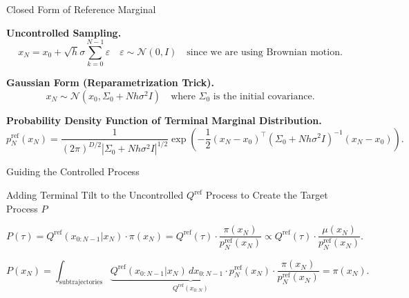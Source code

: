 \documentclass[aspectratio=169,xcolor=dvipsnames]{beamer}
\begin{document}
\begin{frame}{Closed Form of Reference Marginal}
\footnotesize

\textbf{Uncontrolled Sampling.}
\[
x_N = x_0 + \sqrt{h} \sigma \sum_{k=0}^{N-1} \varepsilon \quad \varepsilon \sim \mathcal{N}(0, I) \quad \text{since we are using Brownian motion}.
\]

\textbf{Gaussian Form (Reparametrization Trick).}
\[
x_N \sim \mathcal{N}(x_0, \Sigma_0 + N h \sigma^2 I) \quad \text{where } \Sigma_0 \text{ is the initial covariance.}
\]

\textbf{Probability Density Function of Terminal Marginal Distribution.}
\[
p^{\text{ref}}_N(x_N) = \frac{1}{(2\pi)^{D/2} |\Sigma_0 + N h \sigma^2 I|^{1/2}} \exp\left( -\frac{1}{2} (x_N - x_0)^\top (\Sigma_0 + N h \sigma^2 I)^{-1} (x_N - x_0) \right).
\]

\end{frame}


\begin{frame}{Guiding the Controlled Process}
\footnotesize

\begin{block}{\footnotesize Adding Terminal Tilt to the Uncontrolled $Q^{\text{ref}}$ Process to Create the Target Process $P$}

\[
P(\tau) = Q^{\text{ref}}(x_{0:N-1} | x_N) \cdot \pi(x_N) = Q^{\text{ref}}(\tau) \cdot \frac{\pi(x_N)}{p_N^{\text{ref}}(x_N)} \propto Q^{\text{ref}}(\tau) \cdot \frac{\mu(x_N)}{p_N^{\text{ref}}(x_N)}.
\]
    
\end{block}



\medskip


\[
P(x_N) = \int_{\text{subtrajectories}} \underbrace{Q^{\text{ref}}(x_{0:N-1} | x_N) \, dx_{0:N-1} \cdot p_N^{\text{ref}}(x_N)}_{Q^{\text{ref}}(x_{0:N})} \cdot \frac{\pi(x_N)}{p_N^{\text{ref}}(x_N)} = \pi(x_N).
\]






\end{frame}
\end{document}
